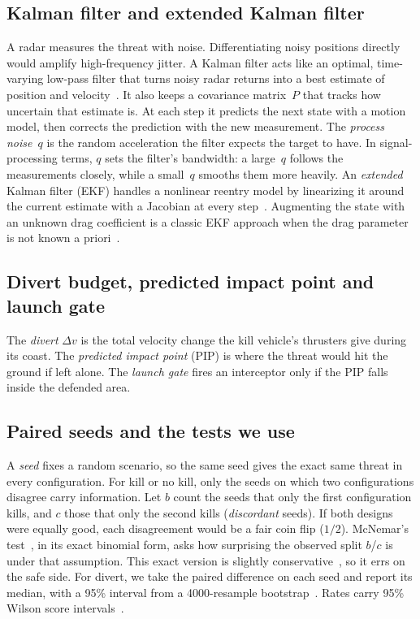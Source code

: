 \documentclass[conference,letterpaper]{IEEEtran}
\newcommand{\dv}{\Delta v}
\begin{document}
\subsection{Kalman filter and extended Kalman filter}

A radar measures the threat with noise.
Differentiating noisy positions directly would amplify high-frequency jitter.
A Kalman filter acts like an optimal, time-varying low-pass filter that turns noisy radar returns into a best estimate of position and velocity~\cite{kalman1960,barshalom2001}.
It also keeps a covariance matrix~$P$ that tracks how uncertain that estimate is.
At each step it predicts the next state with a motion model, then corrects the prediction with the new measurement.
The \emph{process noise}~$q$ is the random acceleration the filter expects the target to have.
In signal-processing terms, $q$ sets the filter's bandwidth: a large~$q$ follows the measurements closely, while a small~$q$ smooths them more heavily.
An \emph{extended} Kalman filter (EKF) handles a nonlinear reentry model by linearizing it around the current estimate with a Jacobian at every step~\cite{mehra1971,farina2002}.
Augmenting the state with an unknown drag coefficient is a classic EKF approach when the drag parameter is not known a priori~\cite{zarchan2009kalman,li2010survey}.

\subsection{Divert budget, predicted impact point and launch gate}

The \emph{divert} $\dv$ is the total velocity change the kill vehicle's thrusters give during its coast.
The \emph{predicted impact point} (PIP) is where the threat would hit the ground if left alone.
The \emph{launch gate} fires an interceptor only if the PIP falls inside the defended area.

\subsection{Paired seeds and the tests we use}

A \emph{seed} fixes a random scenario, so the same seed gives the exact same threat in every configuration.
For kill or no kill, only the seeds on which two configurations disagree carry information.
Let $b$ count the seeds that only the first configuration kills, and $c$ those that only the second kills (\emph{discordant} seeds).
If both designs were equally good, each disagreement would be a fair coin flip ($1/2$).
McNemar's test~\cite{mcnemar1947}, in its exact binomial form, asks how surprising the observed split $b$/$c$ is under that assumption.
This exact version is slightly conservative~\cite{fagerland2013}, so it errs on the safe side.
For divert, we take the paired difference on each seed and report its median, with a 95\% interval from a 4000-resample bootstrap~\cite{efron1979}.
Rates carry 95\% Wilson score intervals~\cite{wilson1927}.
\end{document}
